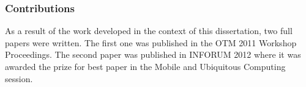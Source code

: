 \subsubsection{Contributions}
\label{sec:contributions}
As a result of the work developed in the context of this dissertation,
two full papers were written. The first one
\cite{gonccalves2011privacy} was published in the OTM 2011 Workshop Proceedings.
The second paper \cite{inforum2012} was published in INFORUM 2012
where it was awarded the prize for best paper in the Mobile and
Ubiquitous Computing session.

